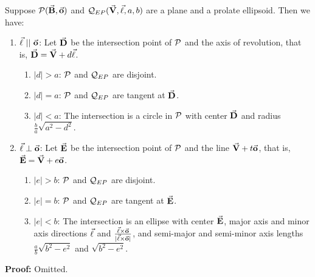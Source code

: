 \begin{lemma}
     Suppose ${\cal P}(\vec{\bf B},\vec{\bf o})$ and
${\cal Q}_{EP}(\vec{\bf V},\vec{\bf \ell},a,b)$ are a plane and a prolate 
ellipsoid.  Then we have:
\begin{enumerate}
     \item $\vec{\bf \ell}\ ||\ \vec{\bf o}$: Let $\vec{\bf D}$ be the intersection
          point of ${\cal P}$ and the axis of revolution, that is,
          $\vec{\bf D}=\vec{\bf V}+d\vec{\bf \ell}$.
     \begin{enumerate}
          \item $|d|>a$: ${\cal P}$ and ${\cal Q}_{EP}$ are disjoint.
          \item $|d|=a$: ${\cal P}$ and ${\cal Q}_{EP}$ are tangent at 
               $\vec{\bf D}$.
          \item $|d|<a$: The intersection is a circle in ${\cal P}$ with
               center $\vec{\bf D}$ and radius $\frac{b}{a}\sqrt{a^2-d^2}$.
     \end{enumerate}
     \item $\vec{\bf \ell}\perp\vec{\bf o}$: Let $\vec{\bf E}$ be the intersection
          point of ${\cal P}$ and the line $\vec{\bf V}+t\vec{\bf o}$, that is,
          $\vec{\bf E}=\vec{\bf V}+e\vec{\bf o}$.
     \begin{enumerate}
          \item $|e|>b$: ${\cal P}$ and ${\cal Q}_{EP}$ are disjoint.
          \item $|e|=b$: ${\cal P}$ and ${\cal Q}_{EP}$ are tangent at 
               $\vec{\bf E}$.
          \item $|e|<b$: The intersection is an ellipse with center 
               $\vec{\bf E}$, major axis and minor axis directions $\vec{\bf \ell}$
       and $\frac{\vec{\bf \ell}\times\vec{\bf o}}{|\vec{\bf \ell}\times\vec{\bf o}|}$,
               and semi-major and semi-minor axis lengths
               $\frac{a}{b}\sqrt{b^2-e^2}$ and $\sqrt{b^2-e^2}$.
     \end{enumerate}
\end{enumerate}
\end{lemma}
{\bf Proof:}  Omitted. \QED

